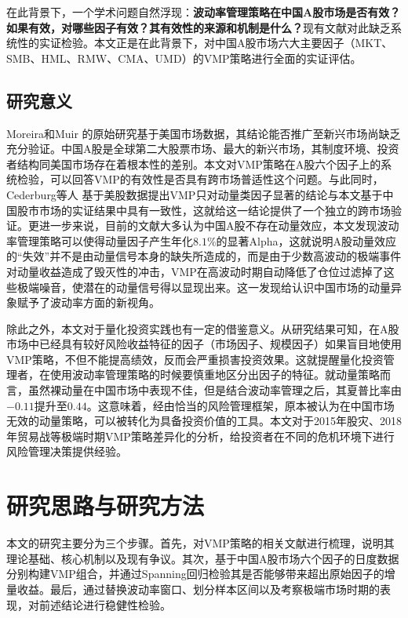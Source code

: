 \documentclass[
    decl-page,
    oneside,
  ]{njuthesis}
\begin{document}
在此背景下，一个学术问题自然浮现：\textbf{波动率管理策略在中国A股市场是否有效？如果有效，对哪些因子有效？其有效性的来源和机制是什么？}现有文献对此缺乏系统性的实证检验。本文正是在此背景下，对中国A股市场六大主要因子（MKT、SMB、HML、RMW、CMA、UMD）的VMP策略进行全面的实证评估。

\subsection{研究意义}

Moreira和Muir \cite{moreira2017volatility} 的原始研究基于美国市场数据，其结论能否推广至新兴市场尚缺乏充分验证。中国A股是全球第二大股票市场、最大的新兴市场，其制度环境、投资者结构同美国市场存在着根本性的差别。本文对VMP策略在A股六个因子上的系统检验，可以回答VMP的有效性是否具有跨市场普适性这个问题。与此同时，Cederburg等人 \cite{cederburg2020performance} 基于美股数据提出VMP只对动量类因子显著的结论与本文基于中国股市市场的实证结果中具有一致性，这就给这一结论提供了一个独立的跨市场验证。更进一步来说，目前的文献大多认为中国A股不存在动量效应\cite{liu2019size}，本文发现波动率管理策略可以使得动量因子产生年化$8.1\%$的显著Alpha，这就说明A股动量效应的“失效”并不是由动量信号本身的缺失所造成的，而是由于少数高波动的极端事件对动量收益造成了毁灭性的冲击，VMP在高波动时期自动降低了仓位过滤掉了这些极端噪音，使潜在的动量信号得以显现出来。这一发现给认识中国市场的动量异象赋予了波动率方面的新视角。

除此之外，本文对于量化投资实践也有一定的借鉴意义。从研究结果可知，在A股市场中已经具有较好风险收益特征的因子（市场因子、规模因子）如果盲目地使用VMP策略，不但不能提高绩效，反而会严重损害投资效果。这就提醒量化投资管理者，在使用波动率管理策略的时候要慎重地区分出因子的特征。就动量策略而言，虽然裸动量在中国市场中表现不佳，但是结合波动率管理之后，其夏普比率由$−0.11$提升至$0.44$。这意味着，经由恰当的风险管理框架，原本被认为在中国市场无效的动量策略，可以被转化为具备投资价值的工具。本文对于2015年股灾、2018年贸易战等极端时期VMP策略差异化的分析，给投资者在不同的危机环境下进行风险管理决策提供经验。

\section{研究思路与研究方法}

本文的研究主要分为三个步骤。首先，对VMP策略的相关文献进行梳理，说明其理论基础、核心机制以及现有争议。其次，基于中国A股市场六个因子的日度数据分别构建VMP组合，并通过Spanning回归检验其是否能够带来超出原始因子的增量收益。最后，通过替换波动率窗口、划分样本区间以及考察极端市场时期的表现，对前述结论进行稳健性检验。
\end{document}
